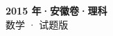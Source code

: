 \documentclass[zihao=-4, a4paper]{ctexart}
\begin{document}
\begin{center}
  {\Large\bfseries 2015 年·安徽卷·理科}\\[4pt]
  {\large 数学 · 试题版}
\end{center}
\medskip
{}

\end{document}

